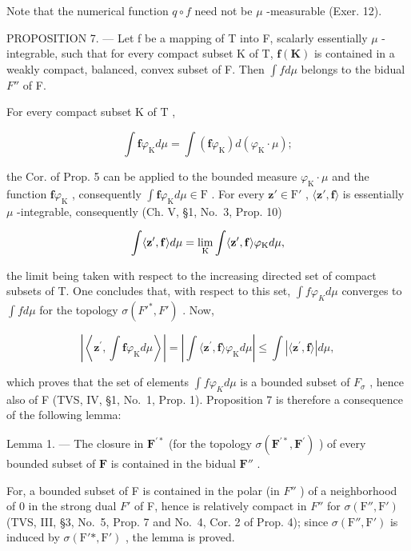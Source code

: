 Note that the numerical function \(q \circ f\) need not be \(\mu\) -measurable (Exer. 12).

PROPOSITION 7. --- Let f be a mapping of T into F, scalarly essentially \(\mu\) -integrable, such that for every compact subset K of T, \(\mathbf{f}(\mathbf{K})\) is contained in a weakly compact, balanced, convex subset of F. Then \(\int f d\mu\) belongs to the bidual \(F''\) of F.

For every compact subset \(\mathrm{K}\) of \(\mathrm{T}\) ,

\[
\int \mathbf {f} \varphi_ {\mathrm{K}} d \mu = \int (\mathbf {f} \varphi_ {\mathrm{K}}) d (\varphi_ {\mathrm{K}} \cdot \mu);
\]

the Cor. of Prop. 5 can be applied to the bounded measure \(\varphi_{\mathrm{K}} \cdot \mu\) and the function \(\mathbf{f}\varphi_{\mathrm{K}}\) , consequently \(\int \mathbf{f}\varphi_{\mathrm{K}} d\mu \in \mathrm{F}\) . For every \(\mathbf{z}' \in \mathrm{F}'\) , \(\langle \mathbf{z}', \mathbf{f} \rangle\) is essentially \(\mu\) -integrable, consequently (Ch. V, §1, No.~3, Prop. 10)

\[
\int \langle {\bf z} ^ {\prime}, {\bf f} \rangle d \mu = \lim _ {\mathrm{K}} \int \langle {\bf z} ^ {\prime}, {\bf f} \rangle \varphi_ {\mathrm{K}} d \mu ,
\]

the limit being taken with respect to the increasing directed set of compact subsets of T. One concludes that, with respect to this set, \(\int f\varphi_{K}d\mu\) converges to \(\int f d\mu\) for the topology \(\sigma(F'^{*},F')\) . Now,

\[
\left| \left\langle \mathbf {z} ^ {\prime}, \int \mathbf {f} \varphi_ {\mathrm{K}} d \mu \right\rangle \right| = \left| \int \langle \mathbf {z} ^ {\prime}, \mathbf {f} \rangle \varphi_ {\mathrm{K}} d \mu \right| \leqslant \int | \langle \mathbf {z} ^ {\prime}, \mathbf {f} \rangle | d \mu ,
\]

which proves that the set of elements \(\int f\varphi_{K}d\mu\) is a bounded subset of \(F_{\sigma}\) , hence also of F (TVS, IV, §1, No.~1, Prop. 1). Proposition 7 is therefore a consequence of the following lemma:

Lemma 1. --- The closure in \(\mathbf{F}^{\prime*}\) (for the topology \(\sigma(\mathbf{F}^{\prime*},\mathbf{F}^{\prime})\) ) of every bounded subset of \(\mathbf{F}\) is contained in the bidual \(\mathbf{F}''\) .

For, a bounded subset of F is contained in the polar (in \(F''\) ) of a neighborhood of 0 in the strong dual \(F'\) of F, hence is relatively compact in \(F''\) for \(\sigma(\mathrm{F}'',\mathrm{F}')\) (TVS, III, §3, No.~5, Prop. 7 and No.~4, Cor. 2 of Prop. 4); since \(\sigma(\mathrm{F}'',\mathrm{F}')\) is induced by \(\sigma(\mathrm{F}'*,\mathrm{F}')\) , the lemma is proved.

